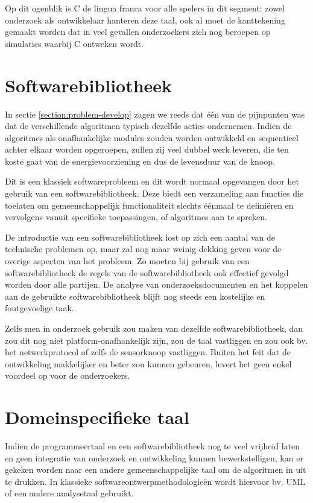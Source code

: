 Op dit ogenblik is C de lingua franca voor alle spelers in dit segment: zowel
onderzoek als ontwikkelaar hanteren deze taal, ook al moet de kanttekening
gemaakt worden dat in veel gevallen onderzoekers zich nog beroepen op
simulaties waarbij C ontweken wordt.

\section{Softwarebibliotheek}
\label{section:solution-library}

In sectie \ref{section:problem-develop} zagen we reeds dat \'e\'en van de
pijnpunten was dat de verschillende algoritmen typisch dezelfde acties
ondernemen. Indien de algoritmes als onafhankelijke modules zouden worden
ontwikkeld en sequentieel achter elkaar worden opgeroepen, zullen zij veel
dubbel werk leveren, die ten koste gaat van de energievoorziening en dus de
levensduur van de knoop.

Dit is een klassiek softwareprobleem en dit wordt normaal opgevangen door het
gebruik van een softwarebibliotheek. Deze biedt een verzameling aan functies
die toelaten om gemeenschappelijk functionaliteit slechts \'e\'enmaal te
defini\"eren en vervolgens vanuit specifieke toepassingen, of algoritmes aan te
spreken.

De introductie van een softwarebibliotheek lost op zich een aantal van de
technische problemen op, maar zal nog maar weinig dekking geven voor de overige
aspecten van het probleem. Zo moeten bij gebruik van een softwarebibliotheek de
regels van de softwarebibliotheek ook effectief gevolgd worden door alle
partijen. De analyse van onderzoeksdocumenten en het koppelen aan de gebruikte
softwarebibliotheek blijft nog steeds een kostelijke en foutgevoelige taak.

Zelfs men in onderzoek gebruik zou maken van dezelfde softwarebibliotheek, dan
zou dit nog niet platform-onafhankelijk zijn, zou de taal vastliggen en zou ook
bv. het netwerkprotocol of zelfs de sensorknoop vastliggen. Buiten het feit dat
de ontwikkeling makkelijker en beter zou kunnen gebeuren, levert het geen enkel
voordeel op voor de onderzoekers.

\section{Domeinspecifieke taal}
\label{section:solution-dsl}

Indien de programmeertaal en een softwarebibliotheek nog te veel vrijheid laten
en geen integratie van onderzoek en ontwikkeling kunnen bewerkstelligen, kan er
gekeken worden naar een andere gemeenschappelijke taal om de algoritmen in uit
te drukken. In klassieke softwareontwerpmethodologie\"en wordt hiervoor bv. UML
\citep{url:uml} of een andere analysetaal gebruikt.

